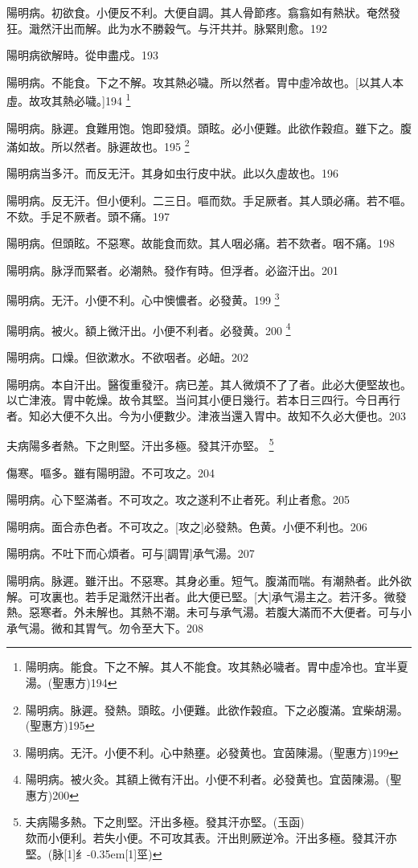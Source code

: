 \documentclass[oneside,b4paper]{ctexbook}
\begin{document}
\begin{flushleft}
陽明病。初欲食。小便反不利。大便自調。其人骨節疼。翕翕如有熱狀。奄然發狂。濈然汗出而解。此为水不勝穀气。与汗共并。脉緊則愈。192

陽明病欲解時。從申盡戍。193

陽明病。不能食。下之不解。攻其熱必噦。所以然者。胃中虛冷故也。[以其人本虛。故攻其熱必噦。]194
\footnote{陽明病。能食。下之不解。其人不能食。攻其熱必噦者。胃中虛冷也。宜半夏湯。(聖惠方)194}

陽明病。脉遲。食難用饱。饱即發煩。頭眩。必小便難。此欲作穀疸。雖下之。腹滿如故。所以然者。脉遲故也。195
\footnote{陽明病。脉遲。發熱。頭眩。小便難。此欲作榖疸。下之必腹滿。宜柴胡湯。(聖惠方)195}

陽明病当多汗。而反无汗。其身如虫行皮中狀。此以久虛故也。196

陽明病。反无汗。但小便利。二三日。嘔而欬。手足厥者。其人頭必痛。若不嘔。不欬。手足不厥者。頭不痛。197

陽明病。但頭眩。不惡寒。故能食而欬。其人咽必痛。若不欬者。咽不痛。198

陽明病。脉浮而緊者。必潮熱。發作有時。但浮者。必盜汗出。201

陽明病。无汗。小便不利。心中懊憹者。必發黄。199
\footnote{陽明病。无汗。小便不利。心中熱壅。必發黄也。宜茵陳湯。(聖惠方)199}

陽明病。被火。額上微汗出。小便不利者。必發黄。200
\footnote{陽明病。被火灸。其額上微有汗出。小便不利者。必發黄也。宜茵陳湯。(聖惠方)200}

陽明病。口燥。但欲漱水。不欲咽者。必衄。202

陽明病。本自汗出。醫復重發汗。病已差。其人微煩不了了者。此必大便堅故也。以亡津液。胃中乾燥。故令其堅。当问其小便日幾行。若本日三四行。今日再行者。知必大便不久出。今为小便數少。津液当還入胃中。故知不久必大便也。203

夫病陽多者熱。下之則堅。汗出多極。發其汗亦堅。
\footnote{夫病陽多熱。下之則堅。汗出多極。發其汗亦堅。(玉函)\\欬而小便利。若失小便。不可攻其表。汗出則厥逆冷。汗出多極。發其汗亦堅。(脉{\hbox{\scalebox{0.68}[1]{纟}\kern-0.35em\scalebox{0.64}[1]{巠}}})}

傷寒。嘔多。雖有陽明證。不可攻之。204

陽明病。心下堅滿者。不可攻之。攻之遂利不止者死。利止者愈。205

陽明病。面合赤色者。不可攻之。[攻之]必發熱。色黄。小便不利也。206

陽明病。不吐下而心煩者。可与[調胃]承气湯。207

陽明病。脉遲。雖汗出。不惡寒。其身必重。短气。腹滿而喘。有潮熱者。此外欲解。可攻裏也。若手足濈然汗出者。此大便已堅。[大]承气湯主之。若汗多。微發熱。惡寒者。外未解也。其熱不潮。未可与承气湯。若腹大滿而不大便者。可与小承气湯。微和其胃气。勿令至大下。208


\end{flushleft}
\end{document}
